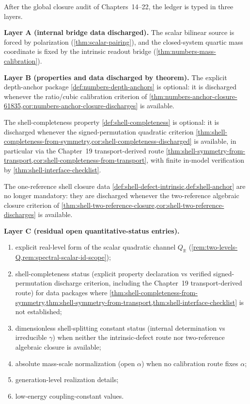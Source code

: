After the global closure audit of Chapters~14--22, the ledger is typed in
three layers.

\textbf{Layer A (internal bridge data discharged).}
The scalar bilinear source is forced by polarization
(\cref{thm:scalar-pairing}), and the closed-system quartic mass coordinate is
fixed by the intrinsic readout bridge
(\cref{thm:numbers-mass-calibration}).

\textbf{Layer B (properties and data discharged by theorem).}
The explicit depth-anchor package \cref{def:numbers-depth-anchors} is
optional: it is discharged whenever the ratio/cubic calibration criterion
of
\cref{thm:numbers-anchor-closure-61835,cor:numbers-anchor-closure-discharges}
is available.

The shell-completeness property \cref{def:shell-completeness} is optional:
it is discharged whenever the signed-permutation quadratic criterion
\cref{thm:shell-completeness-from-symmetry,cor:shell-completeness-discharged}
is available, in particular via the Chapter~19 transport-derived route
\cref{thm:shell-symmetry-from-transport,cor:shell-completeness-from-transport},
with finite in-model verification by
\cref{thm:shell-interface-checklist}.

The one-reference shell closure data
\cref{def:shell-defect-intrinsic,def:shell-anchor} are no longer mandatory:
they are discharged whenever the two-reference algebraic closure criterion
of \cref{thm:shell-two-reference-closure,cor:shell-two-reference-discharges}
is available.

\textbf{Layer C (residual open quantitative-status entries).}
\begin{enumerate}[label=\textup{(\roman*)}]
\item
  explicit real-level form of the scalar quadratic channel
  \(Q_{\mathbb R}\)
  (\cref{rem:two-levels-Q,rem:spectral-scalar-id-scope});
\item
  shell-completeness status (explicit property declaration vs verified
  signed-permutation discharge criterion, including the Chapter~19
  transport-derived route) for data packages where
  \cref{thm:shell-completeness-from-symmetry,thm:shell-symmetry-from-transport,thm:shell-interface-checklist}
  is not established;
\item
  dimensionless shell-splitting constant status
  (internal determination vs irreducible \(\gamma\)) when neither the
  intrinsic-defect route nor two-reference algebraic closure is available;
\item
  absolute mass-scale normalization (open \(\alpha\)) when no calibration
  route fixes \(\alpha\);
\item
  generation-level realization details;
\item
  low-energy coupling-constant values.
\end{enumerate}


